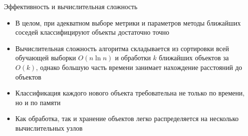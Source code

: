 \documentclass[red,unicode]{beamer}
\begin{document}
\begin{frame}{Эффективность и вычислительная сложность}{}
	\begin{itemize}
	\item В целом, при адекватном выборе метрики и параметров методы ближайших соседей классифицируют объекты достаточно точно
	\item Вычислительная сложность алгоритма складывается из сортировки всей обучающей выборки $O(n \ln n)$ и обработки $k$ ближайших объектов за $O(k)$, однако большую часть времени занимает нахождение расстояний до объектов
	\item Классификация каждого нового объекта требовательна не только по времени, но и по памяти
	\item Как обработка, так и хранение объектов легко распределяется на несколько вычислительных узлов
	\end{itemize}
\end{frame}







%
\end{document}
